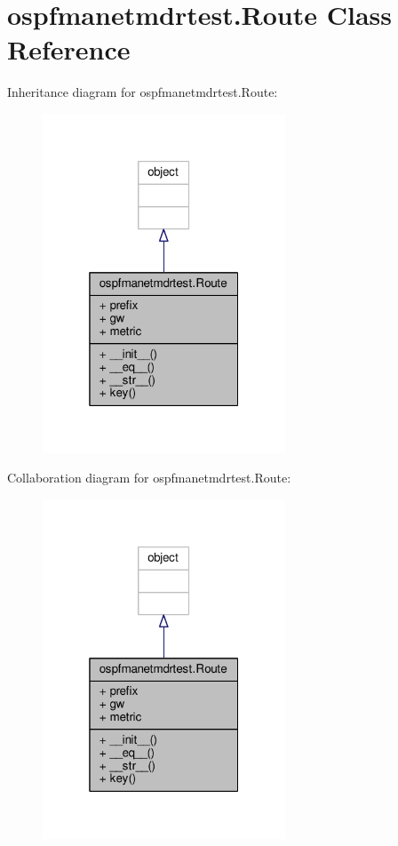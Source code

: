 \hypertarget{classospfmanetmdrtest_1_1_route}{\section{ospfmanetmdrtest.\+Route Class Reference}
\label{classospfmanetmdrtest_1_1_route}
}


Inheritance diagram for ospfmanetmdrtest.\+Route\+:
\nopagebreak
\begin{figure}[H]
\begin{center}
\leavevmode
\includegraphics[width=205pt]{classospfmanetmdrtest_1_1_route__inherit__graph}
\end{center}
\end{figure}


Collaboration diagram for ospfmanetmdrtest.\+Route\+:
\nopagebreak
\begin{figure}[H]
\begin{center}
\leavevmode
\includegraphics[width=205pt]{classospfmanetmdrtest_1_1_route__coll__graph}
\end{center}
\end{figure}
